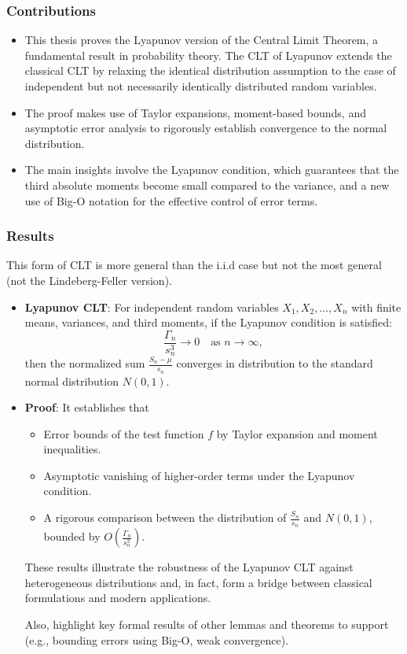 \subsubsection{Contributions}
\begin{itemize}
    \item This thesis proves the Lyapunov version of the Central Limit Theorem, a fundamental result in probability theory. The CLT of Lyapunov extends the classical CLT by relaxing the identical distribution assumption to the case of independent but not necessarily identically distributed random variables.
    \item The proof makes use of Taylor expansions, moment-based bounds, and asymptotic error analysis to rigorously establish convergence to the normal distribution.
    \item The main insights involve the Lyapunov condition, which guarantees that the third absolute moments become small compared to the variance, and a new use of Big-O notation for the effective control of error terms.
\end{itemize}

\subsubsection{Results}
This form of CLT is more general than the i.i.d case but not the most general (not the Lindeberg-Feller version).

\begin{itemize}
    \item \textbf{Lyapunov CLT}: For independent random variables \(X_1, X_2, \ldots, X_n \) with finite means, variances, and third moments, if the Lyapunov condition is satisfied:
$$
\frac{\Gamma_n}{s_n^3} \to 0 \quad \text{as } n \to \infty,
$$
then the normalized sum \( \frac{S_n - \mu}{s_n} \) converges in distribution to the standard normal distribution \( N(0, 1) \).
    \item \textbf{Proof}: It establishes that
    \begin{itemize}
        \item Error bounds of the test function \(f\) by Taylor expansion and moment inequalities.
        \item Asymptotic vanishing of higher-order terms under the Lyapunov condition.  \item A rigorous comparison between the distribution of \( \frac{S_n}{s_n} \) and \( N(0, 1)\), bounded by \( O\left(\frac{\Gamma_n}{s_n^3}\right) \).
    \end{itemize}

These results illustrate the robustness of the Lyapunov CLT against heterogeneous distributions and, in fact, form a bridge between classical formulations and modern applications.

Also, highlight key formal results of other lemmas and theorems to support (e.g., bounding errors using Big-O, weak convergence).
\end{itemize}

